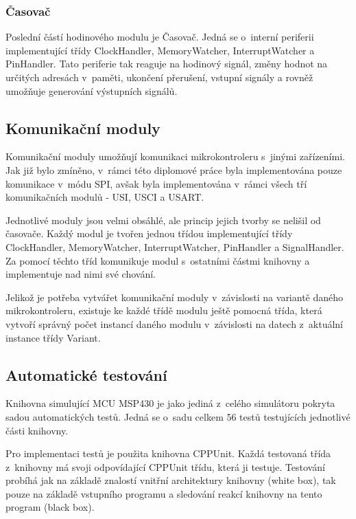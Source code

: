 \subsubsection{Časovač}

Poslední částí hodinového modulu je Časovač. Jedná se o~interní periferii implementující třídy ClockHandler, MemoryWatcher, InterruptWatcher a PinHandler. Tato periferie tak reaguje na hodinový signál, změny hodnot na určitých adresách v~paměti, ukončení přerušení, vstupní signály a rovněž umožňuje generování výstupních signálů.


\subsection{Komunikační moduly}

Komunikační moduly umožňují komunikaci mikrokontroleru s~jinými zařízeními. Jak již bylo zmíněno, v~rámci této diplomové práce byla implementována pouze komunikace v~módu SPI, avšak byla implementována v~rámci všech tří komunikačních modulů - USI, USCI a USART.

Jednotlivé moduly jsou velmi obsáhlé, ale princip jejich tvorby se nelišil od časovače. Každý modul je tvořen jednou třídou implementující třídy ClockHandler, MemoryWatcher, InterruptWatcher, PinHandler a SignalHandler. Za pomocí těchto tříd komunikuje modul s~ostatními částmi knihovny a implementuje nad nimi své chování.

Jelikož je potřeba vytvářet komunikační moduly v~závislosti na variantě daného mikrokontroleru, existuje ke každé třídě modulu ještě pomocná třída, která vytvoří správný počet instancí daného modulu v~závislosti na datech z~aktuální instance třídy Variant.

\subsection{Automatické testování}

Knihovna simulující MCU MSP430 je jako jediná z~celého simulátoru pokryta sadou automatických testů. Jedná se o~sadu celkem 56 testů testujících jednotlivé části knihovny.

Pro implementaci testů je použita knihovna CPPUnit. Každá testovaná třída z~knihovny má svoji odpovídající CPPUnit třídu, která ji testuje. Testování probíhá jak na základě znalostí vnitřní architektury knihovny (white box), tak pouze na základě vstupního programu a sledování reakcí knihovny na tento program (black box).

